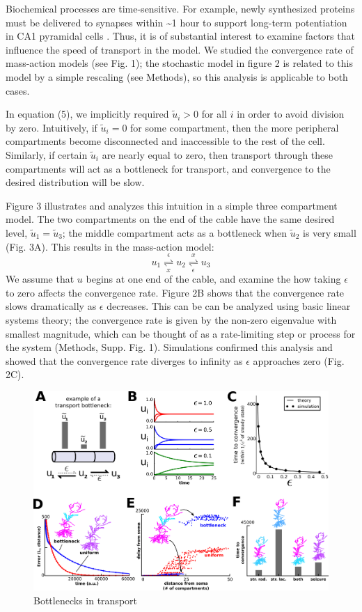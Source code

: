 \documentclass[fleqn,10pt]{wlpeerj}
\begin{document}
Biochemical processes are time-sensitive. For example, newly synthesized proteins must be delivered to synapses within \textasciitilde1 hour to support long-term potentiation in CA1 pyramidal cells \citep{Frey_1997,Frey_1998}. Thus, it is of substantial interest to examine factors that influence the speed of transport in the model. We studied the convergence rate of mass-action models (see Fig. 1); the stochastic model in figure 2 is related to this model by a simple rescaling (see Methods), so this analysis is applicable to both cases.

In equation (5), we implicitly required $\tilde{u}_i > 0$ for all $i$ in order to avoid division by zero. Intuitively, if $\tilde{u}_i = 0$ for some compartment, then the more peripheral compartments become disconnected and inaccessible to the rest of the cell. Similarly, if certain $\tilde{u}_i$ are nearly equal to zero, then transport through these compartments will act as a bottleneck for transport, and convergence to the desired distribution will be slow.

Figure 3 illustrates and analyzes this intuition in a simple three compartment model. The two compartments on the end of the cable have the same desired level, $\tilde{u}_1 = \tilde{u}_3$; the middle compartment acts as a bottleneck when $\tilde{u}_2$ is very small (Fig. 3A). This results in the mass-action model:
$$
u_1 \underset{x}{\overset{\epsilon}{\rightleftharpoons}} u_2 \underset{\epsilon}{\overset{x}{\rightleftharpoons}} u_3
$$
We assume that $u$ begins at one end of the cable, and examine the how taking $\epsilon$ to zero affects the convergence rate. Figure 2B shows that the convergence rate slows dramatically as $\epsilon$ decreases. This can be can be analyzed using basic linear systems theory; the convergence rate is given by the non-zero eigenvalue with smallest magnitude, which can be thought of as a rate-limiting step or process for the system (Methods, Supp. Fig. 1). Simulations confirmed this analysis and showed that the convergence rate diverges to infinity as $\epsilon$ approaches zero (Fig. 2C).

\begin{figure}[h!]
\begin{center}
\includegraphics[width=1\columnwidth]{03_convergence.png}
\caption{Bottlenecks in transport}
\end{center}
\end{figure}
\end{document}

